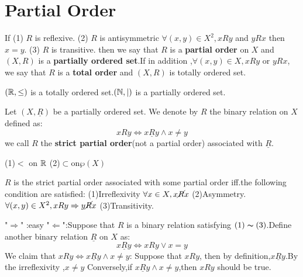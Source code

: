 \documentclass{book}
\numberwithin{equation}{section}
\begin{document}
\section{Partial Order}
\begin{definitionenv}
    If 
    \newline
    (1) $R$ is reflexive.
    \newline
    (2) $R$ is antisymmetric $\forall (x,y)\in X^2,xRy $ and $yRx$ then $x=y$.
    \newline
    (3) $R$ is transitive.
    \newline
    then we say that $R$ is a \textbf{partial order} on $X$ and $(X,R) $ is a \textbf{partially ordered set}.If in addition ,$\forall (x,y)\in X ,xRy$ or $yRx$, we say that $R$ is a \textbf{total order} and $(X,R)$ is totally ordered set. 
\end{definitionenv}
\begin{exampleenv}
    $(\mathbb{R} ,\le)$ is a totally ordered set.$(\mathbb{N} ,|)$ is a partially ordered set.  
\end{exampleenv}
\begin{definitionenv}
    Let $(X,\underline{R})$ be a partially ordered set. We denote by $R$ the binary relation on $X$ defined as:$$xRy \Leftrightarrow x\underline{R}y \wedge x\not=y$$ we call $R$ the \textbf{strict partial order}(not a partial order) associated with $\underline{R}$.
\end{definitionenv}
\begin{exampleenv}
    \quad
    \newline
    (1)$<$ on $\mathbb{R}$
    \newline
    (2)$\subset $on$ \wp (X)$
\end{exampleenv}
\begin{propositionenv}
    $R$ is the strict partial order associated with some partial order iff.the following condition are satisfied:
    \newline
    (1)Irreflexivity $\forall x\in X,x \cancel{R}x$
    \newline
    (2)Asymmetry.$\forall (x,y)\in X^2,xRy\Rightarrow y\cancel{R}x$
    \newline
    (3)Transitivity.
\end{propositionenv}
\begin{proofenv}
    "$\Rightarrow$" :easy
    \newline
    "$\Leftarrow$":Suppose that $R$ is a binary relation satisfying $(1)\thicksim(3)$.Define another binary relation $\underline{R}$ on $X$ as:
    $$x\underline{R}y\Leftrightarrow xRy \vee x=y$$
    We claim that $xRy\Leftrightarrow x\underline{R}y \wedge x\not= y$:
    \newline
    Suppose that $xRy$, then by definition,$x\underline{R}y$.By the irreflexivity ,$x\not=y$
    \newline
    Conversely,if $x\underline{R}y\wedge x\not=y$,then $xRy$ should be true.
\end{proofenv}
\end{document}
